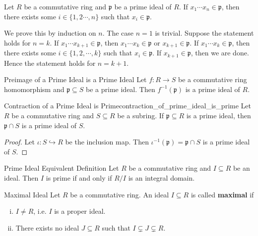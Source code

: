 \begin{proposition}{}{}
    Let $R$ be a commutative ring and $\mathfrak{p}$ be a prime ideal of $R$. If $x_1\cdots x_n\in \mathfrak{p}$, then there exists some $i\in\{1,2\cdots,n\}$ such that $x_i\in \mathfrak{p}$.
\end{proposition}
\begin{prf}
    We prove this by induction on $n$. The case $n=1$ is trivial. Suppose the statement holds for $n=k$. If $x_1\cdots x_{k+1}\in \mathfrak{p}$, then $x_1\cdots x_k\in \mathfrak{p}$ or $x_{k+1}\in \mathfrak{p}$. If $x_1\cdots x_k\in \mathfrak{p}$, then there exists some $i\in\{1,2,\cdots,k\}$ such that $x_i\in \mathfrak{p}$. If $x_{k+1}\in \mathfrak{p}$, then we are done. Hence the statement holds for $n=k+1$.
\end{prf}

\begin{proposition}{Preimage of a Prime Ideal is a Prime Ideal}{}
    Let $f:R\to S$ be a commutative ring homomorphism and $\mathfrak{p}\subseteq S$ be a prime ideal. Then $f^{-1}(\mathfrak{p})$ is a prime ideal of $R$.
\end{proposition}
\begin{corollary}{Contraction of a Prime Ideal is Prime}{contraction_of_prime_ideal_is_prime}
    Let $R$ be a commutative ring and $S\subseteq R$ be a subring. If $\mathfrak{p}\subseteq R$ is a prime ideal, then $\mathfrak{p}\cap S$ is a prime ideal of $S$.
\end{corollary}
\begin{proof}
    Let $\iota:S\hookrightarrow R$ be the inclusion map. Then $\iota^{-1}(\mathfrak{p})=\mathfrak{p}\cap S$ is a prime ideal of $S$.
\end{proof}

\begin{proposition}{Prime Ideal Equivalent Definition}{}
    Let $R$ be a commutative ring and $I\subseteq R$ be an ideal. Then $I$ is prime if and only if $R/I$ is an integral domain.
\end{proposition}

\begin{definition}{Maximal Ideal}{}
    Let $R$ be a commutative ring. An ideal $I\subseteq R$ is called \textbf{maximal} if
    \begin{enumerate}[(i)]
        \item $I\ne R$, i.e. $I$ is a proper ideal.
        \item There exists no ideal $J\subseteq R$ such that $I\subsetneq J\subsetneq R$.
    \end{enumerate}
\end{definition}

